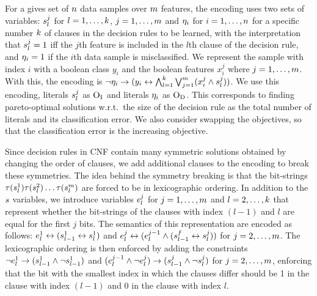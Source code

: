 For a gives set of $n$ data samples over $m$ features, the encoding uses two sets of variables:
$s_l^j$ for $l=1,\dots,k$, $j=1,\dots,m$ and $\eta_i$ for $i=1,\dots,n$ for a specific number $k$ of clauses in the decision rules to be learned, with the interpretation that $s_l^j=1$ iff the $j$th feature is included in the $l$th clause of the decision rule, and $\eta_i=1$ if the $i$th data sample is misclassified.
We represent the sample with index $i$ with a boolean class $y_i$ and the boolean features $x_i^j$ where $j=1,\dots,m$.
With this, the encoding is $\lnot \eta_i \rightarrow (y_i \leftrightarrow \bigwedge_{l=1}^k \bigvee_{j=1}^m (x_i^j \land s_l^j))$.
We use this encoding, literals $s_l^j$ as $\textsc{O}_{\text{I}}$ and literals $\eta_i$ as $\textsc{O}_{\text{D}}$.
This corresponds to finding pareto-optimal solutions w.r.t.\ the size of the decision rule as the total number of literals and its classification error.
We also consider swapping the objectives, so that the classification error is the increasing objective.

Since decision rules in CNF contain many symmetric solutions obtained by changing the order of clauses, we add additional clauses to the encoding to break these symmetries.
The idea behind the symmetry breaking is that the bit-strings $\tau(s_l^1)\tau(s_l^2)\dots\tau(s_l^m)$ are forced to be in lexicographic ordering.
In addition to the $s$ variables, we introduce variables $e_l^j$ for $j=1,\dots,m$ and $l=2,\dots,k$ that represent whether the bit-strings of the clauses with index $(l-1)$ and $l$ are equal for the first $j$ bits.
The semantics of this representation are encoded as follows:
$e_l^1 \leftrightarrow (s_{l-1}^1 \leftrightarrow s_l^1)$ and $e_l^j \leftrightarrow (e_l^{j-1} \land (s_{l-1}^f \leftrightarrow s_l^j))$ for $j=2,\dots,m$.
The lexicographic ordering is then enforced by adding the constraints $\lnot e_l^1 \rightarrow (s_{l-1}^1 \land \lnot s_{l-1}^1)$ and $(e_l^{j-1} \land \lnot e_l^j) \rightarrow (s_{l-1}^j \land \lnot s_l^j)$ for $j=2,\dots,m$, enforcing that the bit with the smallest index in which the clauses differ should be 1 in the clause with index $(l-1)$ and 0 in the clause with index $l$.

